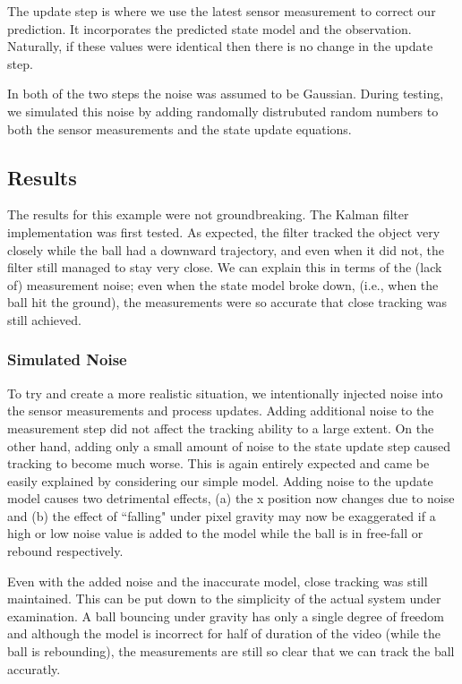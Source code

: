 The update step is where we use the latest sensor measurement to correct our
prediction. It incorporates the predicted state model and the observation. Naturally,
if these values were identical then there is no change in the update step.

In both of the two steps the noise was assumed to be Gaussian. During testing,
we simulated this noise by adding randomally distrubuted random numbers to both
the sensor measurements and the state update equations.

\subsection{Results}
The results for this example were not groundbreaking. The Kalman filter
implementation was first tested. As expected, the filter
tracked the object very closely while the ball had a downward trajectory, and
even when it did not, the filter still managed to stay very close. We can explain
this in terms of the (lack of) measurement noise; even when the state model broke down,
(i.e., when the ball hit the ground), the measurements were so accurate
that close tracking was still achieved.

\subsubsection{Simulated Noise}
To try and create a more realistic situation, we intentionally injected noise into
the sensor measurements and process updates. Adding additional noise to the measurement
step did not affect the tracking ability to a large extent. On the other hand,
adding only a small amount of noise to the state update step caused tracking to
become much worse. This is again entirely expected and came be easily explained
by considering our simple model. Adding noise to the update model causes two
detrimental effects, (a) the x position now changes due to noise and (b) the
effect of ``falling" under pixel gravity may now be exaggerated if a high or low
noise value is added to the model while the ball is in free-fall or rebound respectively.

Even with the added noise and the inaccurate model, close tracking was still
maintained. This can be put down to the simplicity of the actual system under
examination. A ball bouncing under gravity has only a single degree of freedom
and although the model is incorrect for half of duration of the video (while
the ball is rebounding), the measurements are still so clear that we can track
the ball accuratly.

